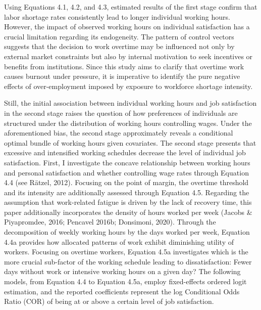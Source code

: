 \documentclass[
  12pt,
]{article}
\begin{document}
Using Equations 4.1, 4.2, and 4.3, estimated results of the first stage
confirm that labor shortage rates consistently lead to longer individual
working hours. However, the impact of observed working hours on
individual satisfaction has a crucial limitation regarding its
endogeneity. The pattern of control vectors suggests that the decision
to work overtime may be influenced not only by external market
constraints but also by internal motivation to seek incentives or
benefits from institutions. Since this study aims to clarify that
overtime work causes burnout under pressure, it is imperative to
identify the pure negative effects of over-employment imposed by
exposure to workforce shortage intensity.

Still, the initial association between individual working hours and job
satisfaction in the second stage raises the question of how preferences
of individuals are structured under the distribution of working hours
controlling wages. Under the aforementioned bias, the second stage
approximately reveals a conditional optimal bundle of working hours
given covariates. The second stage presents that excessive and
intensified working schedules decrease the level of individual job
satisfaction. First, I investigate the concave relationship between
working hours and personal satisfaction and whether controlling wage
rates through Equation 4.4 (see Rätzel, 2012). Focusing on the point of
margin, the overtime threshold and its intensity are additionally
assessed through Equation 4.5. Regarding the assumption that
work-related fatigue is driven by the lack of recovery time, this paper
additionally incorporates the density of hours worked per week (Jacobs
\& Piyapromdee, 2016; Pencavel 2016b; Donsimoni, 2020). Through the
decomposition of weekly working hours by the days worked per week,
Equation 4.4a provides how allocated patterns of work exhibit
diminishing utility of workers. Focusing on overtime workers, Equation
4.5a investigates which is the more crucial sub-factor of the working
schedule leading to dissatisfaction: Fewer days without work or
intensive working hours on a given day? The following models, from
Equation 4.4 to Equation 4.5a, employ fixed-effects ordered logit
estimation, and the reported coefficients represent the log Conditional
Odds Ratio (COR) of being at or above a certain level of job
satisfaction.
\end{document}
